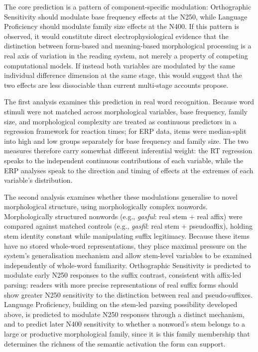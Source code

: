 	The core prediction is a pattern of component-specific modulation: Orthographic Sensitivity should modulate base frequency effects at the N250, while Language Proficiency should modulate family size effects at the N400. If this pattern is observed, it would constitute direct electrophysiological evidence that the distinction between form-based and meaning-based morphological processing is a real axis of variation in the reading system, not merely a property of competing computational models. If instead both variables are modulated by the same individual difference dimension at the same stage, this would suggest that the two effects are less dissociable than current multi-stage accounts propose.

	The first analysis examines this prediction in real word recognition. Because word stimuli were not matched across morphological variables, base frequency, family size, and morphological complexity are treated as continuous predictors in a regression framework for reaction times; for ERP data, items were median-split into high and low groups separately for base frequency and family size. The two measures therefore carry somewhat different inferential weight: the RT regression speaks to the independent continuous contributions of each variable, while the ERP analyses speak to the direction and timing of effects at the extremes of each variable's distribution.

	The second analysis examines whether these modulations generalise to novel morphological structure, using morphologically complex nonwords. Morphologically structured nonwords (e.g., \textit{gasful}: real stem + real affix) were compared against matched controls (e.g., \textit{gasfil}: real stem + pseudoaffix), holding stem identity constant while manipulating suffix legitimacy. Because these items have no stored whole-word representations, they place maximal pressure on the system's generalisation mechanism and allow stem-level variables to be examined independently of whole-word familiarity. Orthographic Sensitivity is predicted to modulate early N250 responses to the suffix contrast, consistent with affix-led parsing: readers with more precise representations of real suffix forms should show greater N250 sensitivity to the distinction between real and pseudo-suffixes. Language Proficiency, building on the stem-led parsing possibility developed above, is predicted to modulate N250 responses through a distinct mechanism, and to predict later N400 sensitivity to whether a nonword's stem belongs to a large or productive morphological family, since it is this family membership that determines the richness of the semantic activation the form can support.
